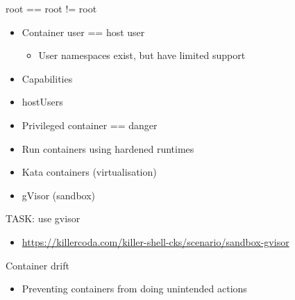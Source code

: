 \documentclass{dcpresentation}
\begin{document}
\begin{frame}{root == root != root}
  \begin{itemize}
  \item Container user == host user
    \begin{itemize}
    \item User namespaces exist, but have limited support
    \end{itemize}
  \item Capabilities
  \item hostUsers
  \item Privileged container == danger
  \end{itemize}
\end{frame}



\begin{frame}
  \begin{itemize}
  \item Run containers using hardened runtimes
  \item Kata containers (virtualisation)
  \item gVisor (sandbox)
  \end{itemize}
\end{frame}

\begin{frame}{TASK: use gvisor}
 \begin{itemize}
  \item \url{https://killercoda.com/killer-shell-cks/scenario/sandbox-gvisor}
 \end{itemize}
\end{frame}


\begin{frame}{Container drift}
 \begin{itemize}
  \item Preventing containers from doing unintended actions
 \end{itemize}
\end{frame}
\end{document}
